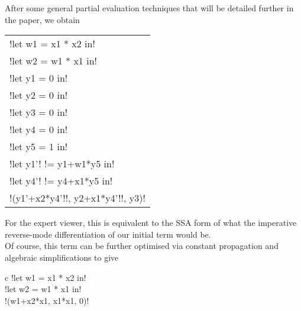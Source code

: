\begin{example}
After some general partial evaluation techniques that will be detailed further in the paper, we obtain     
        \begin{center}
            \begin{tabular}{l}
                !let w1 = x1 * x2 in!\\ 
                !let w2 = w1 * x1 in!\\
                !let y1 = 0 in!\\
                !let y2 = 0 in!\\
                !let y3 = 0 in!\\
                !let y4 = 0 in!\\
                !let y5 = 1 in!\\
                !let y1'! != y1+w1*y5 in!\\
                !let y4'! != y4+x1*y5 in!\\
                !(y1'+x2*y4'!!, y2+x1*y4'!!, y3)!
            \end{tabular}
        \end{center}  
For the expert viewer, this is equivalent to the SSA form \cite{cytron1989efficient} of what the imperative reverse-mode differentiation of our initial term would be.\\
Of course, this term can be further optimised via constant propagation and algebraic simplifications to give
        \begin{center}
            \begin{tabular}{{c}}
                !let w1 = x1 * x2 in!\\ 
                !let w2 = w1 * x1 in!\\
                !(w1+x2*x1, x1*x1, 0)!
            \end{tabular}
        \end{center}
    \end{example}

